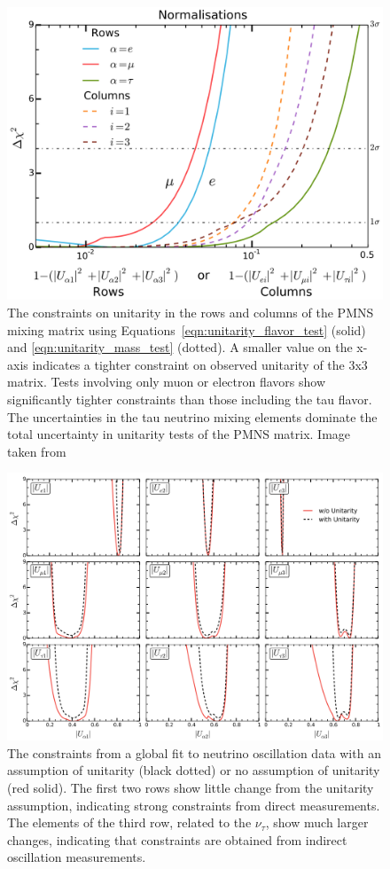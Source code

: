 \begin{figure}[!h]%
	\centering
	\includegraphics[width=0.7\linewidth]{unitarity_norms.png}%
	\caption[Unitarity normalization tests of the PMNS matrix]{The constraints on unitarity in the rows and columns of the PMNS mixing matrix using Equations~\ref{eqn:unitarity_flavor_test} (solid) and \ref{eqn:unitarity_mass_test} (dotted). A smaller value on the x-axis indicates a tighter constraint on observed unitarity of the 3x3 matrix. Tests involving only muon or electron flavors show significantly tighter constraints than those including the tau flavor. The uncertainties in the tau neutrino mixing elements dominate the total uncertainty in unitarity tests of the PMNS matrix. Image taken from \cite{Parke-Unitarity}}
	\label{fig:unitarity_norms}
\end{figure}

\begin{landscape}
\begin{figure}[!h]%
	\centering
	\includegraphics[width=0.8\linewidth]{pmns_unitarity.png}%
	\caption[Constraints on PMNS matrix terms from unitarity]{The constraints from a global fit to neutrino oscillation data\cite{Parke-Unitarity} with an assumption of unitarity (black dotted) or no assumption of unitarity (red solid). The first two rows show little change from the unitarity assumption, indicating strong constraints from direct measurements. The elements of the third row, related to the $\nu_\tau$, show much larger changes, indicating that constraints are obtained from indirect oscillation measurements. }
	\label{fig:pmns_unitarity}
\end{figure}
\end{landscape}

